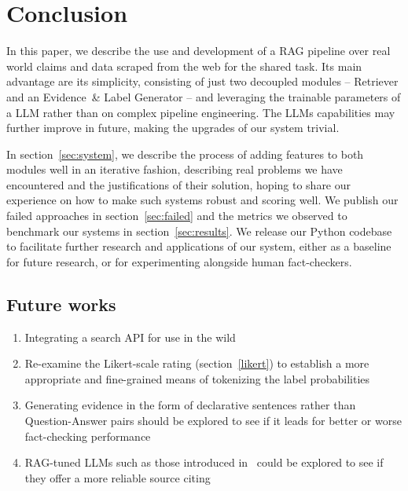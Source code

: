 
\section{Conclusion}
\label{sec:conclusion}
In this paper, we describe the use and development of a RAG pipeline over real world claims and data scraped from the web for the \averitec{} shared task.
Its main advantage are its simplicity, consisting of just two decoupled modules -- Retriever and an Evidence~\& Label Generator -- and leveraging the trainable parameters of a LLM rather than on complex pipeline engineering.
The LLMs capabilities may further improve in future, making the upgrades of our system trivial.

In section~\ref{sec:system}, we describe the process of adding features to both modules well in an iterative fashion, describing real problems we have encountered and the justifications of their solution, hoping to share our experience on how to make such systems robust and scoring well.
We publish our failed approaches in section~\ref{sec:failed} and the metrics we observed to benchmark our systems in section~\ref{sec:results}. 
We release our Python codebase to facilitate further research and applications of our system, either as a baseline for future research, or for experimenting alongside human fact-checkers.

\subsection{Future works}
\begin{enumerate}
    \item Integrating a search API for use in the wild 
    \item Re-examine the Likert-scale rating (section~\ref{likert}) to establish a more appropriate and fine-grained means of tokenizing the label probabilities
    \item Generating evidence in the form of declarative sentences rather than Question-Answer pairs should be explored to see if it leads for better or worse fact-checking performance
    \item RAG-tuned LLMs such as those introduced in~\cite{menick2022teachinglanguagemodelssupport} could be explored to see if they offer a more reliable source citing
\end{enumerate}